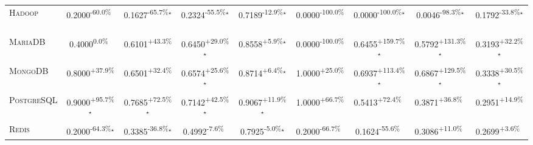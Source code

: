 \begin{table}[htbp]
\begin{tabular}{l|cccc|cccc}
\textsc{Hadoop} & \cellcolor{red!30}0.2000\textsuperscript{-60.0\%}$^{\,\,\,}$ & \cellcolor{red!30}0.1627\textsuperscript{-65.7\%}$^\star$ & \cellcolor{red!30}0.2324\textsuperscript{-55.5\%}$^\star$ & \cellcolor{red!30}0.7189\textsuperscript{-12.9\%}$^\star$ & \cellcolor{red!30}0.0000\textsuperscript{-100.0\%}$^{\,\,\,}$ & \cellcolor{red!30}0.0000\textsuperscript{-100.0\%}$^\star$ & \cellcolor{red!30}0.0046\textsuperscript{-98.3\%}$^\star$ & \cellcolor{red!30}0.1792\textsuperscript{-33.8\%}$^\star$ \\
\textsc{MariaDB} & \cellcolor{red!30}0.4000\textsuperscript{0.0\%}$^{\,\,\,}$ & \cellcolor{green!30}0.6101\textsuperscript{+43.3\%}$^{\,\,\,}$ & \cellcolor{green!30}0.6450\textsuperscript{+29.0\%}$^\star$ & \cellcolor{green!30}0.8558\textsuperscript{+5.9\%}$^\star$ & \cellcolor{red!30}0.0000\textsuperscript{-100.0\%}$^{\,\,\,}$ & \cellcolor{green!30}0.6455\textsuperscript{+159.7\%}$^\star$ & \cellcolor{green!30}0.5792\textsuperscript{+131.3\%}$^\star$ & \cellcolor{green!30}0.3193\textsuperscript{+32.2\%}$^\star$ \\
\textsc{MongoDB} & \cellcolor{green!30}0.8000\textsuperscript{+37.9\%}$^{\,\,\,}$ & \cellcolor{green!30}0.6501\textsuperscript{+32.4\%}$^{\,\,\,}$ & \cellcolor{green!30}0.6574\textsuperscript{+25.6\%}$^\star$ & \cellcolor{green!30}0.8714\textsuperscript{+6.4\%}$^\star$ & \cellcolor{green!30}1.0000\textsuperscript{+25.0\%}$^{\,\,\,}$ & \cellcolor{green!30}0.6937\textsuperscript{+113.4\%}$^\star$ & \cellcolor{green!30}0.6867\textsuperscript{+129.5\%}$^\star$ & \cellcolor{green!30}0.3338\textsuperscript{+30.5\%}$^\star$ \\
\textsc{PostgreSQL} & \cellcolor{green!30}0.9000\textsuperscript{+95.7\%}$^\star$ & \cellcolor{green!30}0.7685\textsuperscript{+72.5\%}$^\star$ & \cellcolor{green!30}0.7142\textsuperscript{+42.5\%}$^\star$ & \cellcolor{green!30}0.9067\textsuperscript{+11.9\%}$^\star$ & \cellcolor{green!30}1.0000\textsuperscript{+66.7\%}$^{\,\,\,}$ & \cellcolor{green!30}0.5413\textsuperscript{+72.4\%}$^{\,\,\,}$ & \cellcolor{green!30}0.3871\textsuperscript{+36.8\%}$^{\,\,\,}$ & \cellcolor{green!30}0.2951\textsuperscript{+14.9\%}$^{\,\,\,}$ \\
\textsc{Redis} & \cellcolor{red!30}0.2000\textsuperscript{-64.3\%}$^\star$ & \cellcolor{red!30}0.3385\textsuperscript{-36.8\%}$^\star$ & \cellcolor{red!30}0.4992\textsuperscript{-7.6\%}$^{\,\,\,}$ & \cellcolor{red!30}0.7925\textsuperscript{-5.0\%}$^\star$ & \cellcolor{red!30}0.2000\textsuperscript{-66.7\%}$^{\,\,\,}$ & \cellcolor{red!30}0.1624\textsuperscript{-55.6\%}$^{\,\,\,}$ & \cellcolor{green!30}0.3086\textsuperscript{+11.0\%}$^{\,\,\,}$ & \cellcolor{green!30}0.2699\textsuperscript{+3.6\%}$^{\,\,\,}$ \\

\end{tabular}
\end{table}
